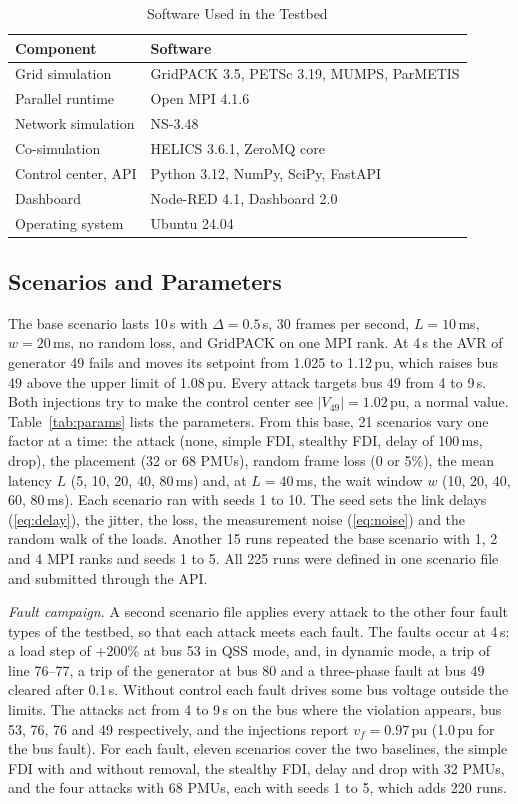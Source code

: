 \documentclass[journal]{IEEEtran}
\newcommand{\pu}{\,pu}
\begin{document}
\begin{table}[t]
\caption{Software Used in the Testbed}
\label{tab:sw}
\centering
\footnotesize
\begin{tabular}{@{}lP{4.8cm}@{}}
\toprule
Component & Software \\
\midrule
Grid simulation & GridPACK 3.5, PETSc 3.19, MUMPS, ParMETIS \\
Parallel runtime & Open MPI 4.1.6 \\
Network simulation & NS-3.48 \\
Co-simulation & HELICS 3.6.1, ZeroMQ core \\
Control center, API & Python 3.12, NumPy, SciPy, FastAPI \\
Dashboard & Node-RED 4.1, Dashboard 2.0 \\
Operating system & Ubuntu 24.04 \\
\bottomrule
\end{tabular}
\end{table}

\subsection{Scenarios and Parameters}

The base scenario lasts 10\,s with $\Delta = 0.5$\,s, 30 frames per second, $L = 10$\,ms, $w = 20$\,ms, no random loss, and GridPACK on one MPI rank. At 4\,s the AVR of generator 49 fails and moves its setpoint from 1.025 to 1.12\pu, which raises bus 49 above the upper limit of 1.08\pu. Every attack targets bus 49 from 4 to 9\,s. Both injections try to make the control center see $|V_{49}| = 1.02$\pu, a normal value. Table~\ref{tab:params} lists the parameters. From this base, 21 scenarios vary one factor at a time: the attack (none, simple FDI, stealthy FDI, delay of 100\,ms, drop), the placement (32 or 68 PMUs), random frame loss (0 or 5\%), the mean latency $L$ (5, 10, 20, 40, 80\,ms) and, at $L = 40$\,ms, the wait window $w$ (10, 20, 40, 60, 80\,ms). Each scenario ran with seeds 1 to 10. The seed sets the link delays (\ref{eq:delay}), the jitter, the loss, the measurement noise (\ref{eq:noise}) and the random walk of the loads. Another 15 runs repeated the base scenario with 1, 2 and 4 MPI ranks and seeds 1 to 5. All 225 runs were defined in one scenario file and submitted through the API.

\emph{Fault campaign.} A second scenario file applies every attack to the other four fault types of the testbed, so that each attack meets each fault. The faults occur at 4\,s: a load step of $+200$\% at bus 53 in QSS mode, and, in dynamic mode, a trip of line 76--77, a trip of the generator at bus 80 and a three-phase fault at bus 49 cleared after 0.1\,s. Without control each fault drives some bus voltage outside the limits. The attacks act from 4 to 9\,s on the bus where the violation appears, bus 53, 76, 76 and 49 respectively, and the injections report $v_f = 0.97$\pu{} (1.0\pu{} for the bus fault). For each fault, eleven scenarios cover the two baselines, the simple FDI with and without removal, the stealthy FDI, delay and drop with 32 PMUs, and the four attacks with 68 PMUs, each with seeds 1 to 5, which adds 220 runs.
\end{document}
